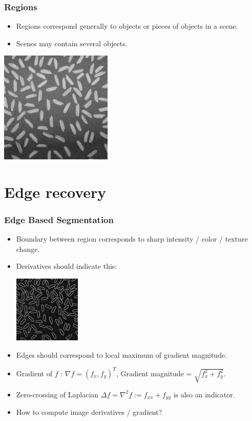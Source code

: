 \documentclass[10pt]{beamer}
\begin{document}
\begin{frame}
  \frametitle{Regions}
  \begin{itemize}
  \item Regions correspond generally to objects or pieces of objects in a scene. 
  \item Scenes may contain several objects.
  \end{itemize}
  \begin{center}
    \includegraphics[width=0.4\textwidth]{IMAGES/rice}
 \end{center}
\end{frame}



\section{Edge recovery}


\begin{frame}
  \frametitle{Edge Based Segmentation}
  \begin{itemize}
  \item Boundary between region corresponds to sharp intensity / color / texture change.
  \item Derivatives should indicate this:
    \begin{center}
      \includegraphics[width=0.25\textwidth]{IMAGES/ricegradient}
    \end{center}
  \item Edges should correspond to local maximum of gradient magnitude.
  \item Gradient of $f$ : $\nabla f = (f_x,f_y)^T$, Gradient magnitude = $\sqrt{f_x^2 + f_y^2}$.
  \item Zero-crossing of Laplacian $\Delta f = \nabla^2 f := f_{xx} + f_{yy}$ is also an indicator.
  \item How to compute image derivatives / gradient?
  \end{itemize} 
  
\end{frame}
\end{document}
